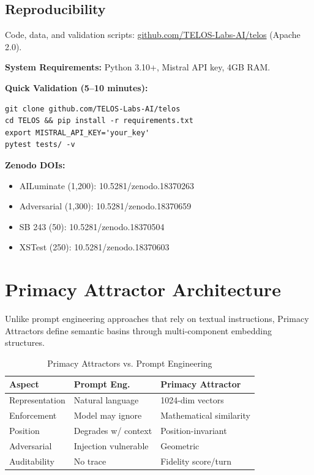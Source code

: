 \documentclass[11pt,twocolumn]{article}
\begin{document}
\subsection{Reproducibility}

Code, data, and validation scripts: \url{github.com/TELOS-Labs-AI/telos} (Apache 2.0).

\textbf{System Requirements:} Python 3.10+, Mistral API key, 4GB RAM.

\textbf{Quick Validation (5--10 minutes):}
\begin{lstlisting}
git clone github.com/TELOS-Labs-AI/telos
cd TELOS && pip install -r requirements.txt
export MISTRAL_API_KEY='your_key'
pytest tests/ -v
\end{lstlisting}

\textbf{Zenodo DOIs:}
\begin{itemize}
    \item AILuminate (1,200): 10.5281/zenodo.18370263
    \item Adversarial (1,300): 10.5281/zenodo.18370659
    \item SB 243 (50): 10.5281/zenodo.18370504
    \item XSTest (250): 10.5281/zenodo.18370603
\end{itemize}

\appendix
\section{Primacy Attractor Architecture}

Unlike prompt engineering approaches that rely on textual instructions, Primacy Attractors define semantic basins through multi-component embedding structures.

\begin{table}[h]
\centering
\small
\caption{Primacy Attractors vs. Prompt Engineering}
\begin{tabular}{@{}lp{2cm}p{2.5cm}@{}}
\toprule
\textbf{Aspect} & \textbf{Prompt Eng.} & \textbf{Primacy Attractor} \\
\midrule
Representation & Natural language & 1024-dim vectors \\
Enforcement & Model may ignore & Mathematical similarity \\
Position & Degrades w/ context & Position-invariant \\
Adversarial & Injection vulnerable & Geometric \\
Auditability & No trace & Fidelity score/turn \\
\bottomrule
\end{tabular}
\end{table}
\end{document}
